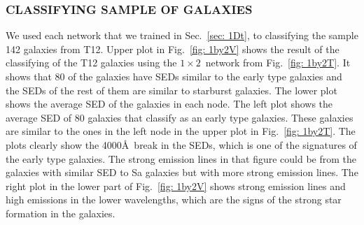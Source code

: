         \subsubsection{ CLASSIFYING SAMPLE OF GALAXIES}
         \label{sec: 1Dv}
            We used each network that we trained in Sec.~\ref{sec: 1Dt}, to classifying the sample 142 galaxies from T12.
            Upper plot in Fig.~\ref{fig: 1by2V} shows the result of the classifying of the T12 galaxies using the $1\times2$~network from Fig.~\ref{fig: 1by2T}.
            It shows that 80 of the galaxies have SEDs similar to the early type galaxies and the SEDs of the rest of them are similar to starburst galaxies.
            The lower plot shows the average SED of the galaxies in each node. 
            The left plot shows the average SED of 80 galaxies that classify as an early type galaxies. 
            These galaxies are similar to the ones in the left node in the upper plot in Fig.~\ref{fig: 1by2T}.
            The plots clearly show the 4000\AA~break in the SEDs, which is one of the signatures of the early type galaxies.
            The strong emission lines in that figure could be from the galaxies with similar SED to Sa galaxies but with more strong emission lines.
            The right plot in the lower part of Fig.~\ref{fig: 1by2V} shows strong emission lines and high emissions in the lower wavelengths, which are the signs of the strong star formation in the galaxies. 
